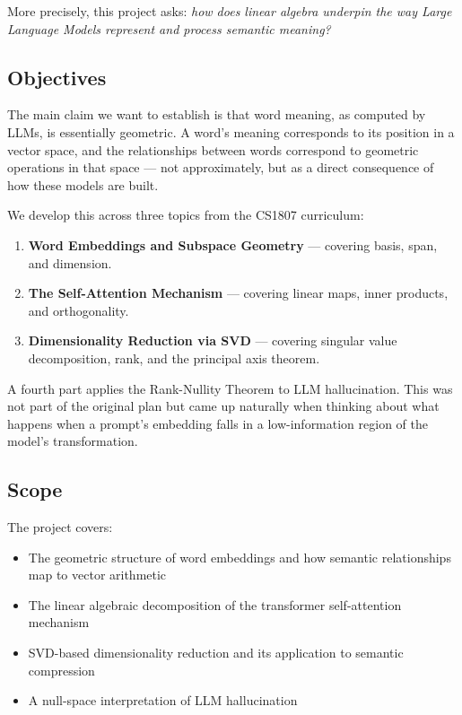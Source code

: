 \documentclass[12pt,a4paper]{article}
\begin{document}
More precisely, this project asks: \textit{how does linear algebra underpin the way Large
Language Models represent and process semantic meaning?}

\subsection{Objectives}

The main claim we want to establish is that word meaning, as computed by LLMs, is
essentially geometric. A word's meaning corresponds to its position in a vector space, and
the relationships between words correspond to geometric operations in that space --- not
approximately, but as a direct consequence of how these models are built.

We develop this across three topics from the CS1807 curriculum:

\begin{enumerate}[label=\arabic*., itemsep=4pt]
    \item \textbf{Word Embeddings and Subspace Geometry} --- covering basis, span, and
          dimension.
    \item \textbf{The Self-Attention Mechanism} --- covering linear maps, inner products,
          and orthogonality.
    \item \textbf{Dimensionality Reduction via SVD} --- covering singular value decomposition,
          rank, and the principal axis theorem.
\end{enumerate}

A fourth part applies the Rank-Nullity Theorem to LLM hallucination. This was not part of
the original plan but came up naturally when thinking about what happens when a prompt's
embedding falls in a low-information region of the model's transformation.

\subsection{Scope}

The project covers:

\begin{itemize}[itemsep=3pt]
    \item The geometric structure of word embeddings and how semantic relationships map to
          vector arithmetic
    \item The linear algebraic decomposition of the transformer self-attention mechanism
    \item SVD-based dimensionality reduction and its application to semantic compression
    \item A null-space interpretation of LLM hallucination
\end{itemize}
\end{document}
